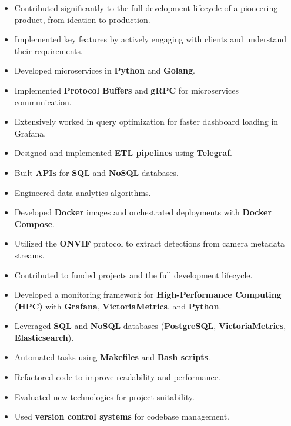\documentclass[10pt,a4paper,ragged2e,withhyper]{altacv}
\begin{document}
\begin{paracol}{2}



\begin{itemize}
      \item Contributed significantly to the full development lifecycle of a pioneering product, from ideation to production.
      \item Implemented key features by actively engaging with clients and understand their requirements.
      \item Developed microservices in \textbf{Python} and \textbf{Golang}.
      \item Implemented \textbf{Protocol Buffers} and \textbf{gRPC} for microservices
            communication.
      \item Extensively worked in query optimization for faster dashboard loading in Grafana.
      \item Designed and implemented \textbf{ETL pipelines} using \textbf{Telegraf}.
      \item Built \textbf{APIs} for \textbf{SQL} and \textbf{NoSQL} databases.
      \item Engineered data analytics algorithms.
      \item Developed \textbf{Docker} images and orchestrated deployments with
            \textbf{Docker Compose}.
      \item Utilized the \textbf{ONVIF} protocol to extract detections from camera metadata
            streams.
\end{itemize}

\bigskip


\begin{itemize}
      \item Contributed to funded projects and the full development lifecycle.
      \item Developed a monitoring framework for \textbf{High-Performance Computing (HPC)}
            with \textbf{Grafana}, \textbf{VictoriaMetrics}, and \textbf{Python}.
      \item Leveraged \textbf{SQL} and \textbf{NoSQL} databases (\textbf{PostgreSQL},
            \textbf{VictoriaMetrics}, \textbf{Elasticsearch}).
      \item Automated tasks using \textbf{Makefiles} and \textbf{Bash scripts}.
      \item Refactored code to improve readability and performance.
      \item Evaluated new technologies for project suitability.
      \item Used \textbf{version control systems} for codebase management.
\end{itemize}




\end{paracol}
\end{document}
